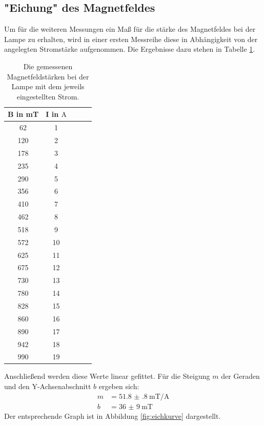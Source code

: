 \documentclass[
  bibliography=totoc,     %
  captions=tableheading,  %
  titlepage=firstiscover, %
]{scrartcl}
\begin{document}
\subsection{"Eichung" des Magnetfeldes}
Um für die weiteren Messungen ein Maß für die stärke des Magnetfeldes bei der Lampe
zu erhalten, wird in einer ersten Messreihe diese in Abhängigkeit von der angelegten
Stromstärke aufgenommen.
Die Ergebnisse dazu stehen in Tabelle \ref{tab:eichung}.
\begin{table}[H]
  \centering
  \caption{Die gemessenen Magnetfeldstärken bei der Lampe mit dem jeweils eingestellten Strom.}
  \label{tab:eichung}
  \begin{tabular}{c c c c c}
    \toprule
    B in \si{\milli\tesla} & I in $\si{\ampere}$ \\
    \midrule
    62  & 1 \\
    120 & 2 \\
    178 & 3 \\
    235 & 4 \\
    290 & 5 \\
    356 & 6 \\
    410 & 7 \\
    462 & 8 \\
    518 & 9 \\
    572 & 10 \\
    625 & 11 \\
    675 & 12 \\
    730 & 13 \\
    780 & 14 \\
    828 & 15 \\
    860 & 16 \\
    890 & 17 \\
    942 & 18 \\
    990 & 19 \\
    \bottomrule
  \end{tabular}
\end{table}
\clearpage
\noindent
Anschließend werden diese Werte linear gefittet.
Für die Steigung $m$ der Geraden und den Y-Achsenabschnitt $b$ ergeben sich:
\begin{align*}
  m &= \SI{51.8(8)}{\milli\tesla\per\ampere}\\
  b &= \SI{36(9)}{\milli\tesla}
\end{align*}
Der entsprechende Graph ist in Abbildung \ref{fig:eichkurve} dargestellt.
\end{document}
